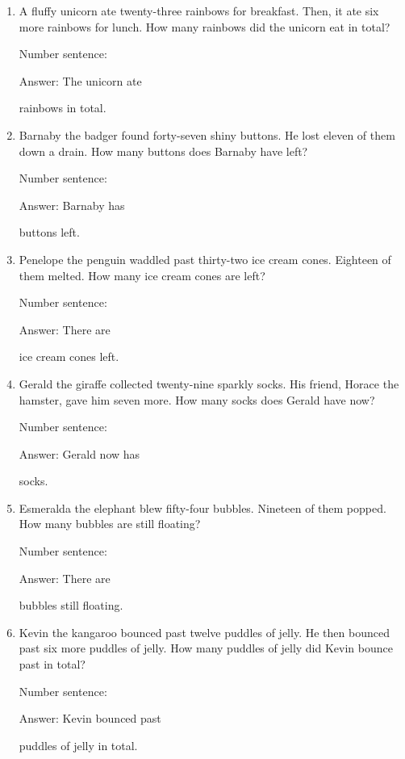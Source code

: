 \documentclass{tufte-book}
\begin{document}
\begin{enumerate}

\item
  A fluffy unicorn ate twenty-three rainbows for breakfast. Then, it ate
  six more rainbows for lunch. How many rainbows did the unicorn eat in
  total?\medskip\par
  Number sentence:
  \dotfill\medskip\par
  Answer: The unicorn ate
  \dotfill\medskip\par\mbox{}\dotfill\medskip\par\mbox{}\dotfill\bigskip
  rainbows in total.
\item
  Barnaby the badger found forty-seven shiny buttons. He lost eleven of
  them down a drain. How many buttons does Barnaby have left?\medskip\par
  Number sentence:
  \dotfill\medskip\par
  Answer: Barnaby has
  \dotfill\medskip\par\mbox{}\dotfill\medskip\par\mbox{}\dotfill\bigskip
  buttons left.
\item
  Penelope the penguin waddled past thirty-two ice cream cones. Eighteen
  of them melted. How many ice cream cones are left?\medskip\par
  Number sentence:
  \dotfill\medskip\par
  Answer: There are
  \dotfill\medskip\par\mbox{}\dotfill\medskip\par\mbox{}\dotfill\bigskip
  ice cream cones left.
\item
  Gerald the giraffe collected twenty-nine sparkly socks. His friend,
  Horace the hamster, gave him seven more. How many socks does Gerald
  have now?\medskip\par
  Number sentence:
  \dotfill\medskip\par
  Answer: Gerald now has
  \dotfill\medskip\par\mbox{}\dotfill\medskip\par\mbox{}\dotfill\bigskip
  socks.
\item
  Esmeralda the elephant blew fifty-four bubbles. Nineteen of them
  popped. How many bubbles are still floating?\medskip\par
  Number sentence:
  \dotfill\medskip\par
  Answer: There are
  \dotfill\medskip\par\mbox{}\dotfill\medskip\par\mbox{}\dotfill\bigskip
  bubbles still floating.
\item
  Kevin the kangaroo bounced past twelve puddles of jelly. He then
  bounced past six more puddles of jelly. How many puddles of jelly did
  Kevin bounce past in total?\medskip\par
  Number sentence:
  \dotfill\medskip\par
  Answer: Kevin bounced past
  \dotfill\medskip\par\mbox{}\dotfill\medskip\par\mbox{}\dotfill\bigskip
  puddles of jelly in total.
\end{enumerate}
\end{document}
